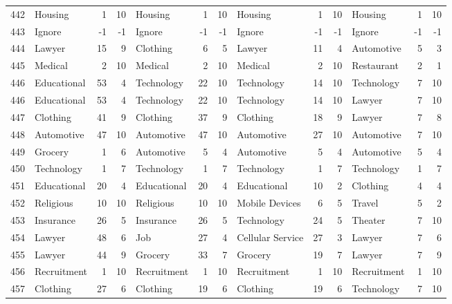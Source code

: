 \begin{figure}[htbp]
\begin{tabular}{rlrrlrrlrrlrr}
    442   & Housing & 1     & 10    & Housing & 1     & 10    & Housing & 1     & 10    & Housing & 1     & 10 \\
    443   & Ignore & -1    & -1    & Ignore & -1    & -1    & Ignore & -1    & -1    & Ignore & -1    & -1 \\
    444   & Lawyer & 15    & 9     & Clothing & 6     & 5     & Lawyer & 11    & 4     & Automotive & 5     & 3 \\
    445   & Medical & 2     & 10    & Medical & 2     & 10    & Medical & 2     & 10    & Restaurant & 2     & 1 \\
    446   & Educational & 53    & 4     & Technology & 22    & 10    & Technology & 14    & 10    & Technology & 7     & 10 \\
    446   & Educational & 53    & 4     & Technology & 22    & 10    & Technology & 14    & 10    & Lawyer & 7     & 10 \\
    447   & Clothing & 41    & 9     & Clothing & 37    & 9     & Clothing & 18    & 9     & Lawyer & 7     & 8 \\
    448   & Automotive & 47    & 10    & Automotive & 47    & 10    & Automotive & 27    & 10    & Automotive & 7     & 10 \\
    449   & Grocery & 1     & 6     & Automotive & 5     & 4     & Automotive & 5     & 4     & Automotive & 5     & 4 \\
    450   & Technology & 1     & 7     & Technology & 1     & 7     & Technology & 1     & 7     & Technology & 1     & 7 \\
    451   & Educational & 20    & 4     & Educational & 20    & 4     & Educational & 10    & 2     & Clothing & 4     & 4 \\
    452   & Religious & 10    & 10    & Religious & 10    & 10    & Mobile Devices & 6     & 5     & Travel & 5     & 2 \\
    453   & Insurance & 26    & 5     & Insurance & 26    & 5     & Technology & 24    & 5     & Theater & 7     & 10 \\
    454   & Lawyer & 48    & 6     & Job   & 27    & 4     & Cellular Service & 27    & 3     & Lawyer & 7     & 6 \\
    455   & Lawyer & 44    & 9     & Grocery & 33    & 7     & Grocery & 19    & 7     & Lawyer & 7     & 9 \\
    456   & Recruitment & 1     & 10    & Recruitment & 1     & 10    & Recruitment & 1     & 10    & Recruitment & 1     & 10 \\
    457   & Clothing & 27    & 6     & Clothing & 19    & 6     & Clothing & 19    & 6     & Technology & 7     & 10 \\

\end{tabular}
\end{figure}
